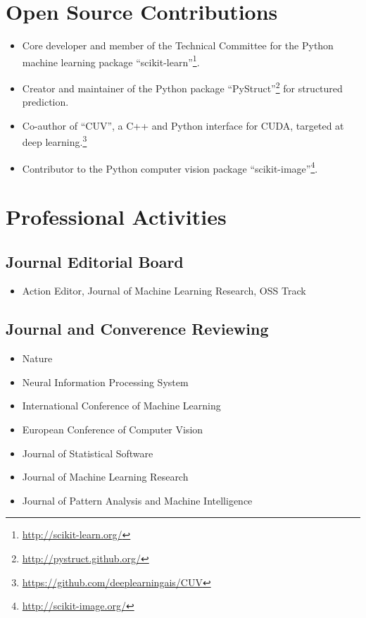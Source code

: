 \documentclass[a4paper,11pt]{article}
\begin{document}
\pagebreak

\section{Open Source Contributions}
\begin{itemize}
    \item Core developer and member of the Technical Committee for the Python machine learning package ``scikit-learn''\footnote{\url{http://scikit-learn.org/}}.
    \item Creator and maintainer of the Python package ``PyStruct''\footnote{\url{http://pystruct.github.org/}} for structured prediction.
    \item Co-author of ``CUV'', a C++ and Python interface for CUDA,
        targeted at deep learning.\footnote{\url{https://github.com/deeplearningais/CUV}}
    \item Contributor to the Python computer vision package ``scikit-image''\footnote{\url{http://scikit-image.org/}}.
\end{itemize}

\section{Professional Activities}
\subsection{Journal Editorial Board}
\begin{itemize}
    \item Action Editor, Journal of Machine Learning Research, OSS Track
\end{itemize}
\subsection{Journal and Converence Reviewing}
\begin{itemize}
    \item Nature
    \item Neural Information Processing System
    \item International Conference of Machine Learning
    \item European Conference of Computer Vision
    \item Journal of Statistical Software
    \item Journal of Machine Learning Research
    \item Journal of Pattern Analysis and Machine Intelligence
\end{itemize}
\end{document}
